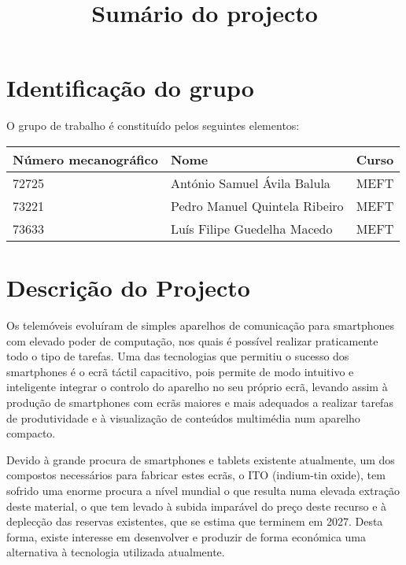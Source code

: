 \documentclass[%
	nofootinbib,
	amsmath,amssymb,
	aps,
	12pt,
	a4paper
]{article}
\begin{document}


\title{Sumário do projecto}
\date{}
\maketitle


\section{Identificação do grupo}
O grupo de trabalho é constituído pelos seguintes elementos:

\begin{center}
	\begin{tabular}{lll}
		Número mecanográfico	&Nome			&Curso	\\ \hline
		72725					&António Samuel Ávila Balula	&MEFT	\\
		73221					&Pedro Manuel Quintela Ribeiro	&MEFT	\\
		73633					&Luís Filipe Guedelha Macedo 	&MEFT	\\
	\end{tabular}
\end{center}

\section{Descrição do Projecto}
Os telemóveis evoluíram de simples aparelhos de comunicação para smartphones com elevado poder de computação, nos quais é possível realizar praticamente todo o tipo de tarefas. Uma das tecnologias que permitiu o sucesso dos smartphones é o ecrã táctil capacitivo, pois permite de modo intuitivo e inteligente integrar o controlo do aparelho no seu próprio ecrã, levando assim à produção de smartphones com ecrãs maiores e mais adequados a realizar tarefas de produtividade e à visualização de conteúdos multimédia num aparelho compacto.

Devido à grande procura de smartphones e tablets existente atualmente, um dos compostos necessários para fabricar estes ecrãs, o ITO (indium-tin oxide), tem sofrido uma enorme procura a nível mundial o que resulta numa elevada extração deste material, o que tem levado à subida imparável do preço deste recurso e à deplecção das reservas existentes, que se estima que terminem em 2027. Desta forma, existe interesse em desenvolver e produzir de forma económica uma alternativa à tecnologia utilizada atualmente.
\end{document}
